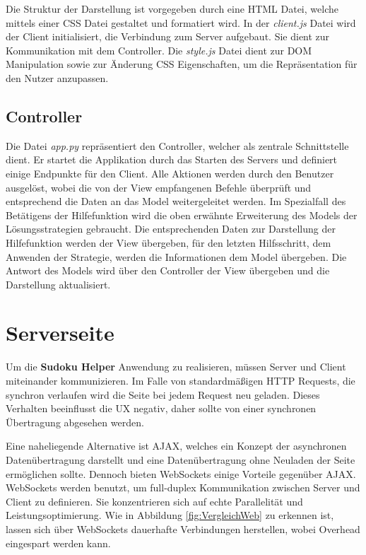 Die Struktur der Darstellung ist vorgegeben durch eine \ac{HTML} Datei, welche mittels einer \ac{CSS} Datei gestaltet und formatiert wird. In der \textit{client.js} Datei wird der Client initialisiert, die Verbindung zum Server aufgebaut. Sie dient zur Kommunikation mit dem Controller. Die \textit{style.js} Datei dient zur DOM Manipulation sowie zur Änderung \ac{CSS} Eigenschaften, um die Repräsentation für den Nutzer anzupassen.

\subsection{Controller}
Die Datei \textit{app.py} repräsentiert den Controller, welcher als zentrale Schnittstelle dient. Er startet die Applikation durch das Starten des Servers und definiert einige Endpunkte für den Client. Alle Aktionen werden durch den Benutzer ausgelöst, wobei die von der View empfangenen Befehle überprüft und entsprechend die Daten an das Model weitergeleitet werden. Im Spezialfall des Betätigens der Hilfefunktion wird die oben erwähnte Erweiterung des Models der Lösungsstrategien gebraucht. Die entsprechenden Daten zur Darstellung der Hilfefunktion werden der View übergeben, für den letzten Hilfsschritt, dem Anwenden der Strategie, werden die Informationen dem Model übergeben. Die Antwort des Models wird über den Controller der View übergeben und die Darstellung aktualisiert. 

\section{Serverseite}

Um die \textbf{Sudoku Helper} Anwendung zu realisieren, müssen Server und Client miteinander kommunizieren. Im Falle von standardmäßigen \ac{HTTP} Requests, die synchron verlaufen wird die Seite bei jedem Request neu geladen. Dieses Verhalten beeinflusst die \ac{UX} negativ, daher sollte von einer synchronen Übertragung abgesehen werden.

Eine naheliegende Alternative ist \ac{AJAX}, welches ein Konzept der asynchronen Datenübertragung darstellt und eine Datenübertragung ohne Neuladen der Seite ermöglichen sollte. Dennoch bieten WebSockets einige Vorteile gegenüber \ac{AJAX}. WebSockets werden benutzt, um full-duplex Kommunikation zwischen Server und Client zu definieren. Sie konzentrieren sich auf echte Parallelität und Leistungsoptimierung. Wie in Abbildung \ref{fig:VergleichWeb} zu erkennen ist, lassen sich über WebSockets dauerhafte Verbindungen herstellen, wobei Overhead eingespart werden kann.   

